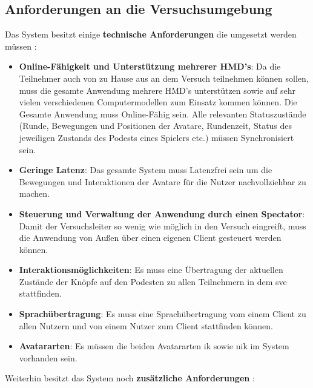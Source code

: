 \documentclass[a4paper,11pt]{article}%
\renewcommand{\\}{\vspace*{0.5\baselineskip} \newline}
\begin{document}
	\subsection{Anforderungen an die Versuchsumgebung}
\label{TechnischeAnforderungen}
Das System besitzt einige \textbf{technische Anforderungen} die umgesetzt werden müssen :
\begin{itemize}
\item \textbf{Online-Fähigkeit und Unterstützung mehrerer HMD's}: Da die Teilnehmer auch von zu Hause aus an dem Versuch teilnehmen können sollen, muss die gesamte Anwendung mehrere HMD's unterstützen sowie auf sehr vielen verschiedenen Computermodellen zum Einsatz kommen können. Die Gesamte Anwendung muss Online-Fähig sein. Alle relevanten Statuszustände (Runde, Bewegungen und Positionen der Avatare, Rundenzeit, Status des jeweiligen Zustands des Podests eines Spielers etc.) müssen Synchronisiert sein.
\item \textbf{Geringe Latenz}: Das gesamte System muss Latenzfrei sein um die Bewegungen und Interaktionen der Avatare für die Nutzer nachvollziehbar zu machen.
\item \textbf{Steuerung und Verwaltung der Anwendung durch einen Spectator}: Damit der Versuchsleiter so wenig wie möglich in den Versuch eingreift, muss die Anwendung von Außen über einen eigenen Client gesteuert werden können.
\item \textbf{Interaktionsmöglichkeiten}: Es muss eine Übertragung der aktuellen Zustände der Knöpfe auf den Podesten zu allen Teilnehmern in dem \ac{sve} stattfinden.
\item \textbf{Sprachübertragung}: Es muss eine Sprachübertragung vom einem Client zu allen Nutzern und von einem Nutzer zum Client stattfinden können.
\item \textbf{Avatararten}: Es müssen die beiden Avatararten \ac{ik} sowie \ac{nik} im System vorhanden sein.
\end{itemize}

Weiterhin besitzt das System noch \textbf{zusätzliche Anforderungen} :
\end{document}
